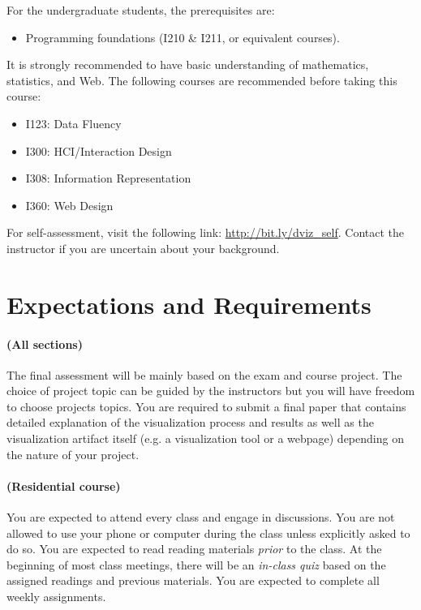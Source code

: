 \documentclass[11pt,article,oneside]{memoir} %
\begin{document}
For the undergraduate students, the prerequisites are:
%
\begin{itemize}\vspace{-10pt}
%
    \item Programming foundations (I210 \& I211, or equivalent courses). 
%
\end{itemize}\vspace{-10pt}
%
It is strongly recommended to have basic understanding of mathematics,
statistics, and Web. The following courses are recommended before taking this
course: 
%
\begin{itemize}\vspace{-10pt}
%
\item I123: Data Fluency \item I300: HCI/Interaction Design \item I308:
Information Representation \item I360: Web Design
%
\end{itemize}\vspace{-10pt}

For self-assessment, visit the following link: \href{http://bit.ly/dviz\_self}{http://bit.ly/dviz\_self}. 
Contact the instructor if you are uncertain about your background. 
\section{Expectations and Requirements}%
\label{sec:requirements}

\paragraph{(All sections)} The final assessment will be mainly based on the exam and course project. The choice of
project topic can be guided by the instructors but you will have freedom to
choose projects topics. You are required to submit a final paper that contains
detailed explanation of the visualization process and results as well as the
visualization artifact itself (e.g. a visualization tool or a webpage)
depending on the nature of your project. 

\paragraph{(Residential course)} You are expected to attend every class and engage in discussions. You are not
allowed to use your phone or computer during the class unless explicitly asked to do so.
You are expected to read reading materials \emph{prior} to the class. At the
beginning of most class meetings, there will be an \emph{in-class quiz} based
on the assigned readings and previous materials. You
are expected to complete all weekly assignments. 
\end{document}
